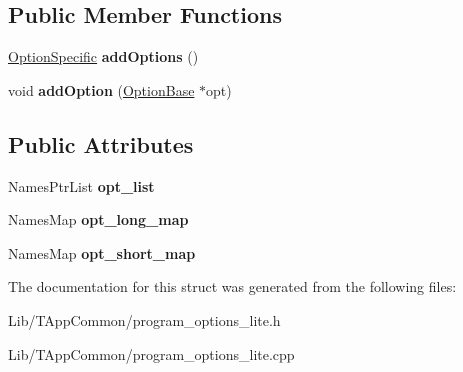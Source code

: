 \subsection*{Public Member Functions}
\begin{DoxyCompactItemize}
\item 
\mbox{\label{structdf_1_1program__options__lite_1_1_options_aaf11f3eae6d9236600b324ebb173a69f}} 
\hyperlink{classdf_1_1program__options__lite_1_1_option_specific}{Option\+Specific} {\bfseries add\+Options} ()
\item 
\mbox{\label{structdf_1_1program__options__lite_1_1_options_a493922413951537a977c7a450431e311}} 
void {\bfseries add\+Option} (\hyperlink{structdf_1_1program__options__lite_1_1_option_base}{Option\+Base} $\ast$opt)
\end{DoxyCompactItemize}
\subsection*{Public Attributes}
\begin{DoxyCompactItemize}
\item 
\mbox{\label{structdf_1_1program__options__lite_1_1_options_a7aebeb799410bdcc9135365f34c77237}} 
Names\+Ptr\+List {\bfseries opt\+\_\+list}
\item 
\mbox{\label{structdf_1_1program__options__lite_1_1_options_a266a5705946be63711b96d564c2bd744}} 
Names\+Map {\bfseries opt\+\_\+long\+\_\+map}
\item 
\mbox{\label{structdf_1_1program__options__lite_1_1_options_a65bb6cda04f4c6a3d792bfd1d4d4f0fd}} 
Names\+Map {\bfseries opt\+\_\+short\+\_\+map}
\end{DoxyCompactItemize}


The documentation for this struct was generated from the following files\+:\begin{DoxyCompactItemize}
\item 
Lib/\+T\+App\+Common/program\+\_\+options\+\_\+lite.\+h\item 
Lib/\+T\+App\+Common/program\+\_\+options\+\_\+lite.\+cpp\end{DoxyCompactItemize}
